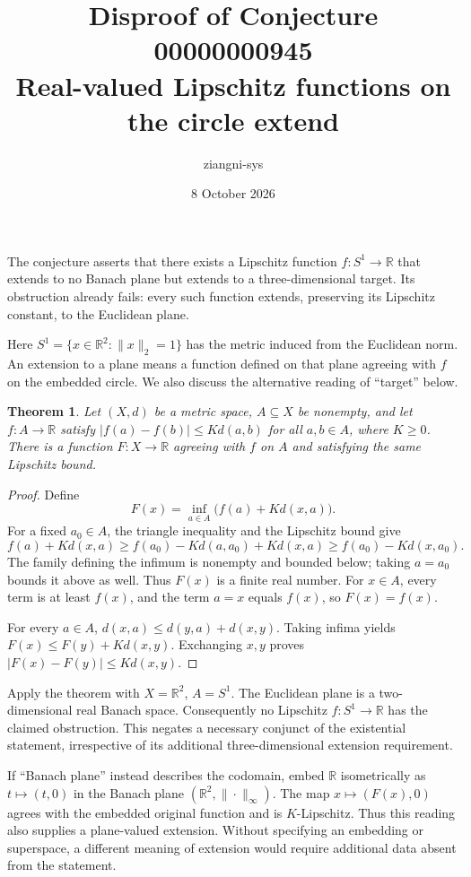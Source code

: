\documentclass[11pt]{article}
\title{Disproof of Conjecture 00000000945\\Real-valued Lipschitz functions on the circle extend}
\author{ziangni-sys}
\date{8 October 2026}
\newtheorem{theorem}{Theorem}
\begin{document}
\maketitle
The conjecture asserts that there exists a Lipschitz function $f:S^1\to\mathbb R$ that extends to no Banach plane but extends to a three-dimensional target. Its obstruction already fails: every such function extends, preserving its Lipschitz constant, to the Euclidean plane.

Here $S^1=\{x\in\mathbb R^2:\|x\|_2=1\}$ has the metric induced from the Euclidean norm. An extension to a plane means a function defined on that plane agreeing with $f$ on the embedded circle. We also discuss the alternative reading of ``target'' below.

\begin{theorem}
Let $(X,d)$ be a metric space, $A\subseteq X$ be nonempty, and let $f:A\to\mathbb R$ satisfy $|f(a)-f(b)|\le Kd(a,b)$ for all $a,b\in A$, where $K\ge0$. There is a function $F:X\to\mathbb R$ agreeing with $f$ on $A$ and satisfying the same Lipschitz bound.
\end{theorem}
\begin{proof}
Define
\[
 F(x)=\inf_{a\in A}\bigl(f(a)+Kd(x,a)\bigr).
\]
For a fixed $a_0\in A$, the triangle inequality and the Lipschitz bound give
\[
 f(a)+Kd(x,a)\ge f(a_0)-Kd(a,a_0)+Kd(x,a)
 \ge f(a_0)-Kd(x,a_0).
\]
The family defining the infimum is nonempty and bounded below; taking $a=a_0$ bounds it above as well. Thus $F(x)$ is a finite real number. For $x\in A$, every term is at least $f(x)$, and the term $a=x$ equals $f(x)$, so $F(x)=f(x)$.

For every $a\in A$, $d(x,a)\le d(y,a)+d(x,y)$. Taking infima yields $F(x)\le F(y)+Kd(x,y)$. Exchanging $x,y$ proves $|F(x)-F(y)|\le Kd(x,y)$.
\end{proof}
Apply the theorem with $X=\mathbb R^2$, $A=S^1$. The Euclidean plane is a two-dimensional real Banach space. Consequently no Lipschitz $f:S^1\to\mathbb R$ has the claimed obstruction. This negates a necessary conjunct of the existential statement, irrespective of its additional three-dimensional extension requirement.

If ``Banach plane'' instead describes the codomain, embed $\mathbb R$ isometrically as $t\mapsto(t,0)$ in the Banach plane $(\mathbb R^2,\|\cdot\|_\infty)$. The map $x\mapsto(F(x),0)$ agrees with the embedded original function and is $K$-Lipschitz. Thus this reading also supplies a plane-valued extension. Without specifying an embedding or superspace, a different meaning of extension would require additional data absent from the statement.
\end{document}
